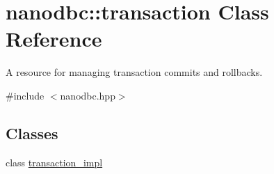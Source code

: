 \hypertarget{classnanodbc_1_1transaction}{}\section{nanodbc\+::transaction Class Reference}
\label{classnanodbc_1_1transaction}


A resource for managing transaction commits and rollbacks.  




{\ttfamily \#include $<$nanodbc.\+hpp$>$}

\subsection*{Classes}
\begin{DoxyCompactItemize}
\item 
class \mbox{\hyperlink{classnanodbc_1_1transaction_1_1transaction__impl}{transaction\+\_\+impl}}
\end{DoxyCompactItemize}

